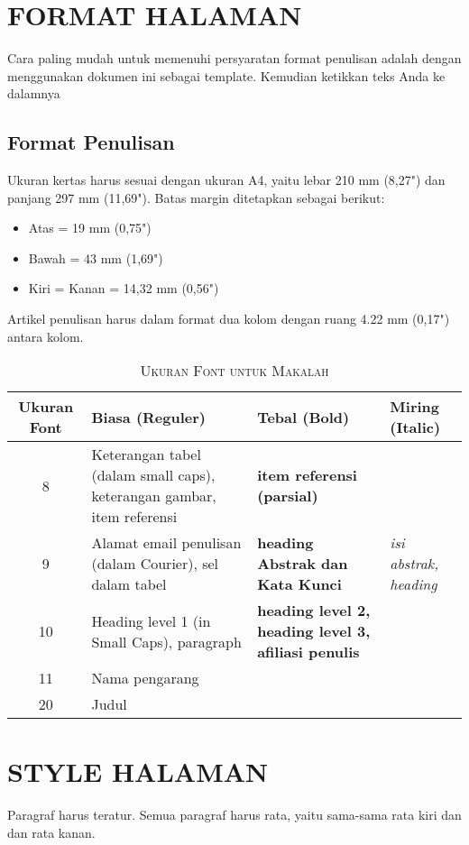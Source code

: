 \documentclass[10pt,twocolumn]{article}
\begin{document}
\section{\MakeUppercase{Format Halaman}}
Cara paling mudah untuk memenuhi persyaratan format penulisan adalah dengan menggunakan dokumen ini sebagai template. Kemudian ketikkan teks Anda ke dalamnya

\subsection{Format Penulisan}
Ukuran kertas harus sesuai dengan ukuran A4, yaitu lebar 210 mm (8,27") dan panjang 297 mm (11,69"). Batas margin ditetapkan sebagai berikut:
\begin{itemize}
\item Atas = 19 mm (0,75")
\item Bawah = 43 mm (1,69")
\item Kiri = Kanan = 14,32 mm (0,56")
\end{itemize}

Artikel penulisan harus dalam format dua kolom dengan ruang 4.22 mm (0,17") antara kolom.

\begin{table}[h]
\centering
\caption{{\eightp\textsc{Ukuran Font untuk Makalah}}}
\label{tab:font_sizes}
{\eightp
\begin{tabular}{|c|p{2.5cm}|p{1.8cm}|p{1.8cm}|}
\hline
\textbf{Ukuran Font} & \textbf{Biasa (Reguler)} & \textbf{Tebal (Bold)} & \textbf{Miring (Italic)} \\
\hline
8 & Keterangan tabel (dalam small caps), keterangan gambar, item referensi & \textbf{item referensi (parsial)} & \\
\hline
9 & Alamat email penulisan (dalam Courier), sel dalam tabel & \textbf{heading Abstrak dan Kata Kunci} & \textit{isi abstrak, heading} \\
\hline
10 & Heading level 1 (in Small Caps), paragraph & \textbf{heading level 2, heading level 3, afiliasi penulis} & \\
\hline
11 & Nama pengarang & & \\
\hline
20 & Judul & & \\
\hline
\end{tabular}
}
\end{table}

\section{\MakeUppercase{Style Halaman}}
Paragraf harus teratur. Semua paragraf harus rata, yaitu sama-sama rata kiri dan dan rata kanan.
\end{document}
